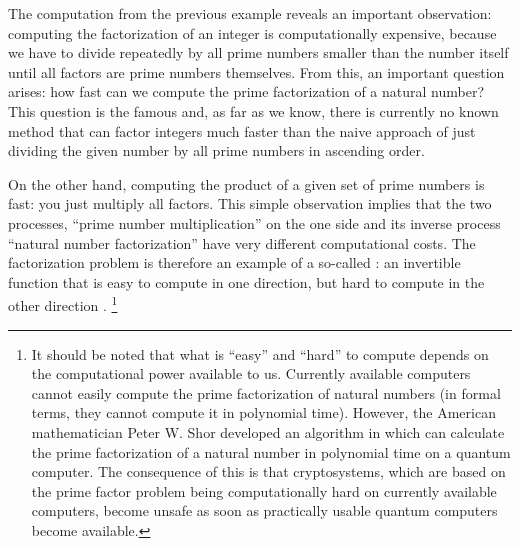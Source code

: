 The computation from the previous example reveals an important observation: computing the factorization of an integer is computationally expensive, because we have to divide repeatedly by all prime numbers smaller than the number itself until all factors are prime numbers themselves. From this, an important question arises: how fast can we compute the prime factorization of a natural number? This question is the famous  and, as far as we know, there is currently no known method that can factor integers much faster than the naive approach of just dividing the given number by all prime numbers in ascending order.

On the other hand, computing the product of a given set of prime numbers is fast: you just multiply all factors. This simple observation implies that the two processes, ``prime number multiplication'' on the one side and its inverse process ``natural number factorization'' have very different computational costs. The factorization problem is therefore an example of a so-called : an invertible function that is easy to compute in one direction, but hard to compute in the other direction 
. 
\footnote{It should be noted that what is ``easy'' and ``hard'' to compute depends on the computational power available to us. Currently available computers cannot easily compute the prime factorization of natural numbers (in formal terms, they cannot compute it in polynomial time). However, the American mathematician Peter W. Shor developed an algorithm in \citeyear{shor94} which can calculate the prime factorization of a natural number in polynomial time on a quantum computer. The consequence of this is that cryptosystems, which are based on the prime factor problem being computationally hard on currently available computers, become unsafe as soon as practically usable quantum computers become available.}


